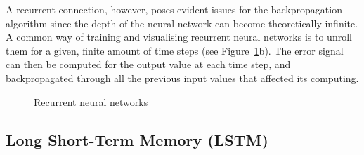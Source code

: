A recurrent connection, however, poses evident issues for the backpropagation
algorithm since the depth of the neural network can become theoretically
infinite.  A common way of training and visualising recurrent neural networks 
is to unroll them for a given, finite amount of time steps (see 
Figure~\ref{fig:rnn}b).  The error signal can then be computed
for the output value at each time step, and backpropagated through all the
previous input values that affected its computing.\\

\begin{figure}[]
	\centering
	\qquad
	\caption{Recurrent neural networks}
	\label{fig:rnn}
\end{figure}

\subsection{Long Short-Term Memory (LSTM)}


